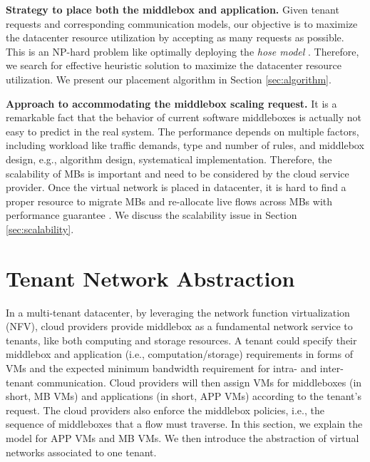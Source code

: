 \documentclass[review]{elsarticle}
\begin{document}
\textbf{Strategy to place both the middlebox and application.}
Given tenant requests and corresponding communication models, our objective is to maximize the datacenter resource utilization by accepting as many requests as possible. This is an NP-hard problem like optimally deploying the \emph{hose model} \cite{hose_model, cloudmirror}. Therefore, we search for effective heuristic solution to maximize the datacenter resource utilization. We present our placement algorithm in Section \ref{sec:algorithm}. 

\textbf{Approach to accommodating the middlebox scaling request.}
It is a remarkable fact that %
the behavior of current software middleboxes is actually not easy to predict in the real system. 
The performance depends on multiple factors, including workload like traffic demands, type and number of rules, and middlebox design, e.g., algorithm design, systematical implementation. 
Therefore, %
the scalability of MBs is important and need to be considered by the cloud service provider. Once the virtual network is placed in datacenter, it is hard to find a proper resource to migrate MBs and re-allocate live flows across MBs with performance guarantee \cite{G13dio}. We discuss the scalability issue in Section \ref{sec:scalability}.


\section{Tenant Network Abstraction}\label{sec:abstraction}
In a multi-tenant datacenter, by leveraging the network function virtualization (NFV), cloud providers provide middlebox as a fundamental network service to tenants, like both computing and storage resources. A tenant could specify their middlebox and application (i.e., computation/storage) requirements in forms of VMs and the expected minimum bandwidth requirement for intra- and inter-tenant communication. Cloud providers will then assign VMs for middleboxes (in short, MB VMs) and applications (in short, APP VMs) according to the tenant's request. The cloud providers also enforce the middlebox policies, i.e., the sequence of middleboxes that a flow must traverse. In this section, we explain the model for APP VMs and MB VMs. We then introduce the abstraction of virtual networks associated to one tenant.
\end{document}
